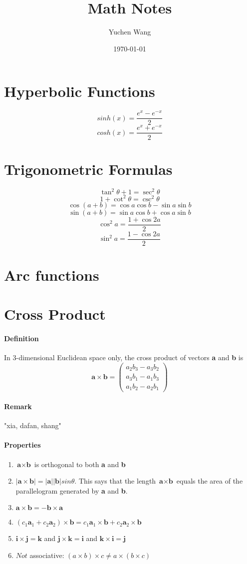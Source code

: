 \documentclass[11pt]{article}
\title{Math Notes}
\author{Yuchen Wang}
\date{\today}
\newcommand{\tb}[1]{\textbf{#1}}
\begin{document}
	\maketitle
	\tableofcontents
	\newpage
\section{Hyperbolic Functions} 
$$sinh(x) = \frac{e^x - e^{-x}}{2}$$
$$cosh(x) = \frac{e^x + e^{-x}}{2}$$
\section{Trigonometric Formulas}
$$\tan^2{\theta} + 1 = \sec^2{\theta}$$
$$1 + \cot^2{\theta} = \csc^2{\theta}$$
$$\cos{(a+b)} = \cos{a}\cos{b}-\sin{a}\sin{b}$$
$$\sin{(a+b)} = \sin{a}\cos{b}+\cos{a}\sin{b}$$
$$\cos^2{a} = \frac{1+\cos{2a}}{2} $$
$$\sin^2{a} = \frac{1-\cos{2a}}{2} $$
\section{Arc functions}
\section{Cross Product}
\paragraph{Definition} In 3-dimensional Euclidean space only, the cross product of vectors \tb{a} and \tb{b} is 
$$\tb{a} \times \tb{b} = \begin{pmatrix}a_2b_3 - a_3b_2\\ a_3b_1-a_1b_3\\a_1b_2-a_2b_1\end{pmatrix}$$ 
\paragraph{Remark} "xia, dafan, shang"
\paragraph{Properties}
\begin{enumerate}
	\item $\tb{a} \times \tb{b}$ is orthogonal to both \tb{a} and \tb{b}
	\item $|\tb{a} \times \tb{b}| = |\tb{a}||\tb{b}|sin\theta$. This says that the length $\tb{a} \times \tb{b}$ equals the area of the parallelogram generated by \tb{a} and \tb{b}.
	\item $\tb{a} \times \tb{b} = -\tb{b} \times \tb{a}$
	\item $(c_1\tb{a}_1 + c_2\tb{a}_2) \times \tb{b} = c_1\tb{a}_1 \times \tb{b} + c_2\tb{a}_2 \times \tb{b}$
	\item $\tb{i} \times \tb{j} = \tb{k}$ and $\tb{j} \times \tb{k} = \tb{i}$ and $\tb{k} \times \tb{i} = \tb{j}$
	\item $Not$ associative: $(a \times b) \times c \neq a \times (b \times c)$
\end{enumerate} 
\end{document}
